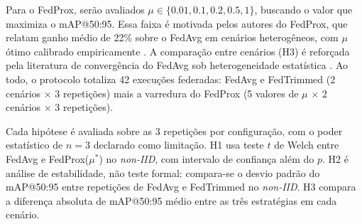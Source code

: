 \documentclass[conference]{IEEEtran}
\begin{document}
Para o FedProx, serão avaliados $\mu \in \{0.01, 0.1, 0.2, 0.5, 1\}$, buscando o valor que maximiza o mAP@50:95. Essa faixa é motivada pelos autores do FedProx, que relatam ganho médio de 22\% sobre o FedAvg em cenários heterogêneos, com $\mu$ ótimo calibrado empiricamente \cite{fedprox2020}. A comparação entre cenários (H3) é reforçada pela literatura de convergência do FedAvg sob heterogeneidade estatística \cite{li2020noniid}. Ao todo, o protocolo totaliza 42 execuções federadas: FedAvg e FedTrimmed (2 cenários $\times$ 3 repetições) mais a varredura do FedProx (5 valores de $\mu$ $\times$ 2 cenários $\times$ 3 repetições).

Cada hipótese é avaliada sobre as 3 repetições por configuração, com o poder estatístico de $n=3$ declarado como limitação. H1 usa teste $t$ de Welch entre FedAvg e FedProx($\mu^*$) no \textit{non-IID}, com intervalo de confiança além do $p$. H2 é análise de estabilidade, não teste formal: compara-se o desvio padrão do mAP@50:95 entre repetições de FedAvg e FedTrimmed no \textit{non-IID}. H3 compara a diferença absoluta de mAP@50:95 médio entre as três estratégias em cada cenário.

\begin{table}[H]
\centering
\renewcommand{\arraystretch}{1.25}
\caption{Resumo de Materiais e Métodos.}
\label{tab:materiais_metodos}
\end{table}
\end{document}

